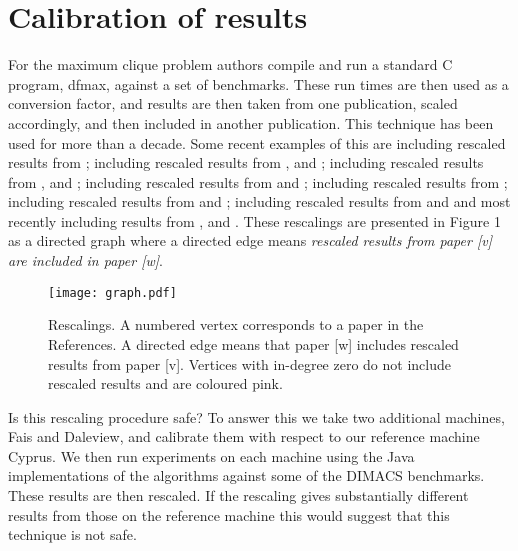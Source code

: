 \documentclass[runningheads]{llncs}
\begin{document}
\section{Calibration of results}
\vspace{-1.5mm}
For the maximum clique problem authors compile and run a standard C program, dfmax, against a 
set of benchmarks. These run times are then used as a conversion factor, 
and results are then taken from one publication, scaled accordingly, and then included in another publication. This 
technique has been used for more than a decade. Some recent examples of this are
\cite{prjo2002} including rescaled results from \cite{sewell98};
\cite{regin2003} including rescaled results from \cite{prjo2002}, \cite{wood97} and \cite{fahle};
\cite{tomita2007} including rescaled results from \cite{prjo2002}, \cite{fahle} and \cite{sewell98};
\cite{tomita2010} including rescaled results from \cite{regin2003} and \cite{prjo2002};
\cite{segundo2011} including rescaled  results from \cite{Konc_Janezic_2007}; 
\cite{segundo2011b} including rescaled  results from \cite{segundo2011} and \cite{tomita2010};
\cite{aaai2010} including rescaled results from \cite{tomita2007} and \cite{regin2003} and most recently
\cite{MCMD14} including results from \cite{segundo2011}, \cite{segundo2011b} and \cite{tomita2010}.
These rescalings are presented in Figure 1 as a directed graph where a directed edge  means 
\emph{rescaled results from paper [v] are included in paper [w]}.

\begin{figure}
\begin{center}
 \texttt{[image: graph.pdf]}
\vspace{-20mm}
 \caption{Rescalings. A numbered vertex corresponds to a paper in the References. A directed edge  means that paper [w] includes rescaled results from paper [v]. Vertices with in-degree
zero do not include rescaled results and are coloured pink.}
 \end{center}
\label{graph}
\end{figure}

Is this rescaling procedure safe?
To answer this we take two additional machines, Fais and Daleview, and calibrate them with respect to our reference machine Cyprus. 
We then run experiments 
on each machine using the Java implementations of the algorithms against some of the DIMACS benchmarks. These results are
then rescaled. If the rescaling gives substantially different results from those on the reference machine
this would suggest that this technique is not safe.
\end{document}
